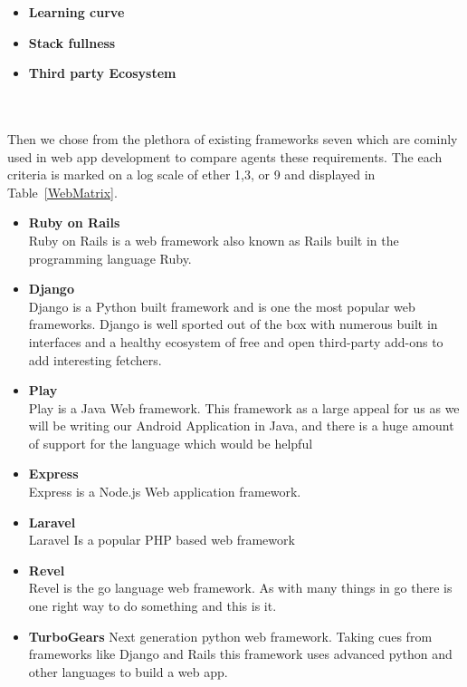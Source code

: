 \documentclass[Letter,11pt]{article}
\begin{document}
		\begin{minipage}[t]{0.5\textwidth}
		\begin{itemize}
			\item \textbf{Learning curve} \\
			
			
			\item \textbf{Stack fullness} \\
			
			\item \textbf{Third party Ecosystem}\\
			
			
		\end{itemize}
		\end{minipage}\\
		\\
		Then we chose from the plethora of existing frameworks seven which are cominly used in web app development to compare agents these requirements. The each criteria is marked on a log scale of ether 1,3, or 9 and displayed in Table~\ref{WebMatrix}.
		
		\begin{itemize}
			\item \textbf{Ruby on Rails} \\
			Ruby on Rails is a web framework also known as Rails built in the programming language Ruby. 
			\item \textbf{Django} \\
			Django is a Python built framework and is one the most popular web frameworks. Django is well sported out of the box with numerous built in interfaces and a healthy ecosystem of free and open third-party add-ons to add interesting fetchers.
			\item \textbf{Play} \\
			Play is a Java Web framework. This framework as a large appeal for us as we will be writing our Android Application in Java, and there is a huge amount of support for the language which would be helpful
			\item  \textbf{Express}\\
			Express is a Node.js Web application framework.
			\item \textbf{Laravel} \\
			Laravel Is a popular PHP based web framework
			\item \textbf{Revel} \\
			Revel is the go language web framework. As with many things in go there is one right way to do something and this is it.
			\item \textbf{TurboGears}
			Next generation python web framework. Taking cues from frameworks like Django and Rails this framework uses advanced python and other languages to build a web app.
		\end{itemize}
		
\end{document}

